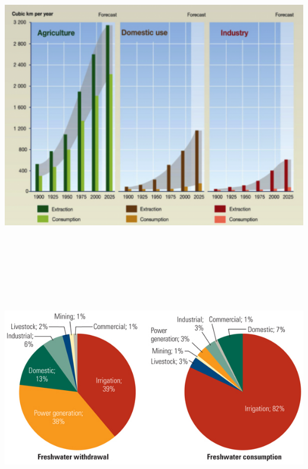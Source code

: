 \documentclass[]{article}
\begin{document}
\hypertarget{section-27}{%
\subsection{}\label{section-27}}

\includegraphics[width=\textwidth,height=4.6875in]{figures/m10_consumptive_use.png}

\hypertarget{section-28}{%
\subsection{}\label{section-28}}

\includegraphics[width=\textwidth,height=4.16667in]{figures/m10_withdraw_vs_consumption.png}
\end{document}
